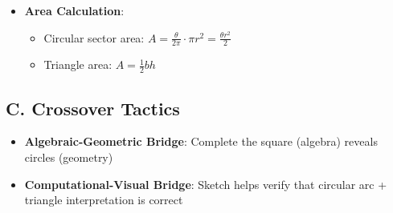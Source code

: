 \documentclass[]{article}
\begin{document}
\begin{tacticalbox}
\begin{itemize}[leftmargin=*]
    \item \textbf{Area Calculation}: 
    \begin{itemize}
        \item Circular sector area: $A = \frac{\theta}{2\pi} \cdot \pi r^2 = \frac{\theta r^2}{2}$
        \item Triangle area: $A = \frac{1}{2}bh$
    \end{itemize}
\end{itemize}

\subsection*{C. Crossover Tactics}
\begin{itemize}[leftmargin=*]
    \item \textbf{Algebraic-Geometric Bridge}: Complete the square (algebra) reveals circles (geometry)
    
    \item \textbf{Computational-Visual Bridge}: Sketch helps verify that circular arc + triangle interpretation is correct
\end{itemize}
\end{tacticalbox}
\end{document}
